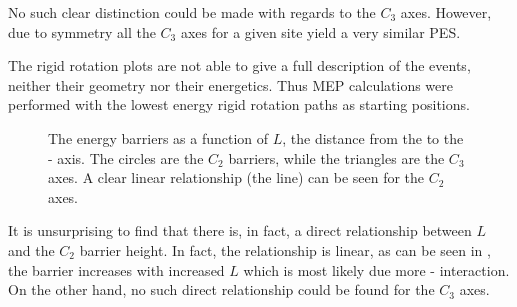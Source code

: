 No such clear distinction could be made with regards to the $C_3$ axes.
However, due to symmetry all the $C_3$ axes for a given site yield a very similar PES.

The rigid rotation plots are not able to give a full description of the events, neither their geometry nor their energetics.
Thus MEP calculations were performed with the lowest energy rigid rotation paths as starting positions.

\begin{figure}
\begin{center}
\caption{The energy barriers as a function of $L$, the distance from the  to the - axis.
The circles are the $C_2$ barriers, while the triangles are the $C_3$ axes.
A clear linear relationship (the line) can be seen for the $C_2$ axes.
}
\label{fig:mg-barriers}
\end{center}
\end{figure}

It is unsurprising to find that there is, in fact, a direct relationship between $L$ and the $C_2$ barrier height.
In fact, the relationship is linear, as can be seen in , the barrier increases with increased $L$ which is most likely due more - interaction.
On the other hand, no such direct relationship could be found for the $C_3$ axes.



